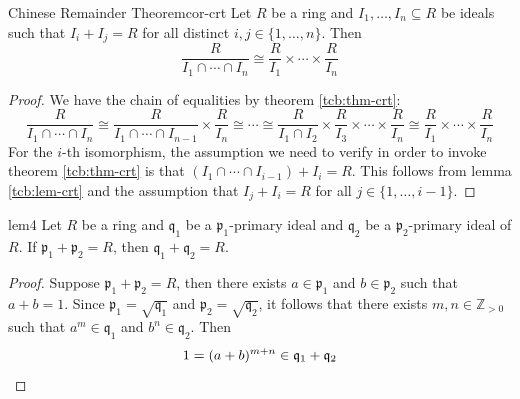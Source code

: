 \documentclass[a4paper,10pt]{article}
\theoremstyle{definition}
\newcommand\lref[2][blue!60!black]{lemma \ref{tcb:#2}}
\newcommand\tref[2][blue!60!black]{theorem \ref{tcb:#2}}
\begin{document}
\begin{corollary}{Chinese Remainder Theorem}{cor-crt}
Let $R$ be a ring and $I_1,\dots,I_n\subseteq R$ be ideals
such that $I_i+I_j=R$ for all distinct $i,j\in\{1,\dots,n\}$.
Then 
\begin{equation*}
\frac{R}{I_1\cap\cdots\cap I_n}\cong\frac{R}{I_1}\times\cdots\times\frac{R}{I_n}
\end{equation*}
\end{corollary}
\begin{proof}
We have the chain of equalities by \tref{thm-crt}:
\begin{equation*}
\frac{R}{I_1\cap\cdots\cap I_n}\cong\frac{R}{I_1\cap\cdots\cap I_{n-1}}\times\frac{R}{I_n}
\cong\cdots\cong\frac{R}{I_1\cap I_2}\times\frac{R}{I_3}\times\cdots\times\frac{R}{I_n}
\cong\frac{R}{I_1}\times\cdots\times\frac{R}{I_n}
\end{equation*}
For the $i$-th isomorphism, the assumption we need to verify in order to 
invoke \tref{thm-crt} is that $(I_1\cap\cdots\cap I_{i-1})+I_i=R$.
This follows from \lref{lem-crt} and the assumption that 
$I_j+I_i=R$ for all $j\in\{1,\dots,i-1\}$.
\end{proof}

\begin{lemma}{}{lem4}
Let $R$ be a ring and $\mathfrak{q}_1$ be a $\mathfrak{p}_1$-primary ideal
and $\mathfrak{q}_2$ be a $\mathfrak{p}_2$-primary ideal of $R$.
If $\mathfrak{p}_1+\mathfrak{p}_2=R$, then $\mathfrak{q}_1+\mathfrak{q}_2=R$. 
\end{lemma}
\begin{proof}
Suppose $\mathfrak{p}_1+\mathfrak{p}_2=R$, then there exists 
$a\in\mathfrak{p}_1$ and $b\in\mathfrak{p}_2$ such that $a+b=1$.
Since $\mathfrak{p}_1=\sqrt{\mathfrak{q}_1}$ and 
$\mathfrak{p}_2=\sqrt{\mathfrak{q}_2}$,
it follows that there exists $m,n\in\mathbb{Z}_{>0}$ such that
$a^m\in\mathfrak{q}_1$ and $b^n\in\mathfrak{q}_2$.
Then 
\begin{equation*}
1=(a+b)^{m+n}\in\mathfrak{q}_1+\mathfrak{q}_2\qedhere
\end{equation*}
\end{proof}
\end{document}
